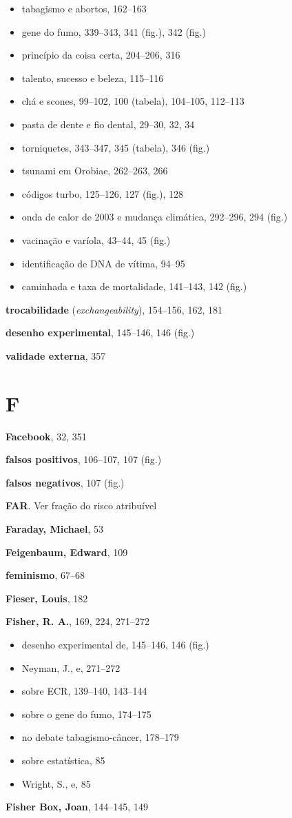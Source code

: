 \documentclass[11pt,a5paper,twoside]{book}
\begin{document}
\begin{itemize}
\item tabagismo e abortos, 162–163
\item gene do fumo, 339–343, 341 (fig.), 342 (fig.)
\item princípio da coisa certa, 204–206, 316
\item talento, sucesso e beleza, 115–116
\item chá e scones, 99–102, 100 (tabela), 104–105, 112–113
\item pasta de dente e fio dental, 29–30, 32, 34
\item torniquetes, 343–347, 345 (tabela), 346 (fig.)
\item tsunami em Orobiae, 262–263, 266
\item códigos turbo, 125–126, 127 (fig.), 128
\item onda de calor de 2003 e mudança climática, 292–296, 294 (fig.)
\item vacinação e varíola, 43–44, 45 (fig.)
\item identificação de DNA de vítima, 94–95
\item caminhada e taxa de mortalidade, 141–143, 142 (fig.)
\end{itemize}
\textbf{trocabilidade} (\textit{exchangeability}), 154–156, 162, 181

\textbf{desenho experimental}, 145–146, 146 (fig.)

\textbf{validade externa}, 357

\section{F}
\textbf{Facebook}, 32, 351

\textbf{falsos positivos}, 106–107, 107 (fig.)

\textbf{falsos negativos}, 107 (fig.)

\textbf{FAR}. Ver fração do risco atribuível

\textbf{Faraday, Michael}, 53

\textbf{Feigenbaum, Edward}, 109

\textbf{feminismo}, 67–68

\textbf{Fieser, Louis}, 182

\textbf{Fisher, R. A.}, 169, 224, 271–272

\begin{itemize}
\item desenho experimental de, 145–146, 146 (fig.)
\item Neyman, J., e, 271–272
\item sobre ECR, 139–140, 143–144
\item sobre o gene do fumo, 174–175
\item no debate tabagismo-câncer, 178–179
\item sobre estatística, 85
\item Wright, S., e, 85
\end{itemize}
\textbf{Fisher Box, Joan}, 144–145, 149
\end{document}
